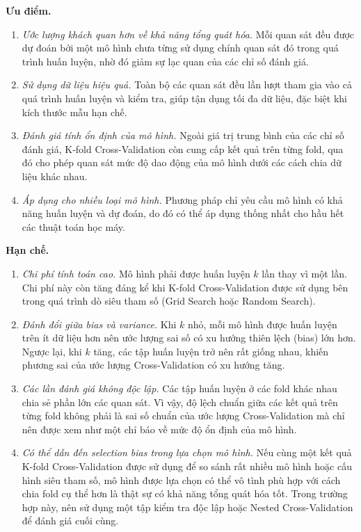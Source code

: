 \documentclass[14pt,a4paper]{extarticle}\usepackage[]{graphicx}\usepackage[]{xcolor}
\begin{document}
\textbf{Ưu điểm.}
\begin{enumerate}
    \item \emph{Ước lượng khách quan hơn về khả năng tổng quát hóa.} Mỗi quan
          sát đều được dự đoán bởi một mô hình chưa từng sử dụng chính quan
          sát đó trong quá trình huấn luyện, nhờ đó giảm sự lạc quan của các
          chỉ số đánh giá.

    \item \emph{Sử dụng dữ liệu hiệu quả.} Toàn bộ các quan sát đều lần lượt
          tham gia vào cả quá trình huấn luyện và kiểm tra, giúp tận dụng tối
          đa dữ liệu, đặc biệt khi kích thước mẫu hạn chế.

    \item \emph{Đánh giá tính ổn định của mô hình.} Ngoài giá trị trung bình
          của các chỉ số đánh giá, K-fold Cross-Validation còn cung cấp kết
          quả trên từng fold, qua đó cho phép quan sát mức độ dao động của mô
          hình dưới các cách chia dữ liệu khác nhau.

    \item \emph{Áp dụng cho nhiều loại mô hình.} Phương pháp chỉ yêu cầu mô
          hình có khả năng huấn luyện và dự đoán, do đó có thể áp dụng thống
          nhất cho hầu hết các thuật toán học máy.
\end{enumerate}

\textbf{Hạn chế.}
\begin{enumerate}
    \item \emph{Chi phí tính toán cao.} Mô hình phải được huấn luyện $k$ lần
          thay vì một lần. Chi phí này còn tăng đáng kể khi K-fold
          Cross-Validation được sử dụng bên trong quá trình dò siêu tham số
          (Grid Search hoặc Random Search).

    \item \emph{Đánh đổi giữa bias và variance.} Khi $k$ nhỏ, mỗi mô hình
          được huấn luyện trên ít dữ liệu hơn nên ước lượng sai số có xu
          hướng thiên lệch (bias) lớn hơn. Ngược lại, khi $k$ tăng, các tập
          huấn luyện trở nên rất giống nhau, khiến phương sai của ước lượng
          Cross-Validation có xu hướng tăng.

    \item \emph{Các lần đánh giá không độc lập.} Các tập huấn luyện ở các
          fold khác nhau chia sẻ phần lớn các quan sát. Vì vậy, độ lệch chuẩn
          giữa các kết quả trên từng fold không phải là sai số chuẩn của
          ước lượng Cross-Validation mà chỉ nên được xem như một chỉ báo về
          mức độ ổn định của mô hình.

    \item \emph{Có thể dẫn đến selection bias trong lựa chọn mô hình.} Nếu
          cùng một kết quả K-fold Cross-Validation được sử dụng để so sánh
          rất nhiều mô hình hoặc cấu hình siêu tham số, mô hình được lựa chọn
          có thể vô tình phù hợp với cách chia fold cụ thể hơn là thật sự có
          khả năng tổng quát hóa tốt. Trong trường hợp này, nên sử dụng một
          tập kiểm tra độc lập hoặc Nested Cross-Validation để đánh giá cuối
          cùng.
\end{enumerate}
\end{document}
